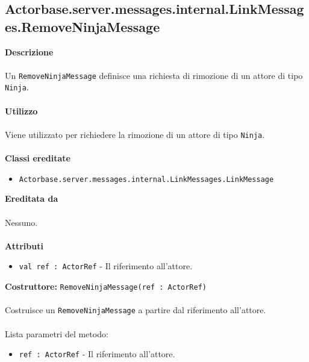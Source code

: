 \documentclass[a4paper]{article}
\begin{document}
	\subsection{Actorbase.server.messages.internal.LinkMessages.RemoveNinjaMessage}
		\textbf{Descrizione}
			\\ \\
			Un \texttt{RemoveNinjaMessage} definisce una richiesta di rimozione di un attore di tipo \texttt{Ninja}.
			\\ \\
		\textbf{Utilizzo}
			\\ \\
			Viene utilizzato per richiedere la rimozione di un attore di tipo \texttt{Ninja}.
			\\ \\
		\textbf{Classi ereditate}
			\begin{itemize}
				\item \texttt{Actorbase.server.messages.internal.LinkMessages.LinkMessage}
			\end{itemize}
		\textbf{Ereditata da}
			\\ \\
			Nessuno.
			\\ \\
		\textbf{Attributi}
			\begin{itemize}
				\item \texttt{val ref : ActorRef} - Il riferimento all'attore.
			\end{itemize}
		\textbf{Costruttore:} \texttt{RemoveNinjaMessage(ref : ActorRef)}
		\\ \\
		Costruisce un \texttt{RemoveNinjaMessage} a partire dal riferimento all'attore.
		\\ \\
		Lista parametri del metodo:
			\begin{itemize}
				\item \texttt{ref : ActorRef} - Il riferimento all'attore.
			\end{itemize}
			
\end{document}
